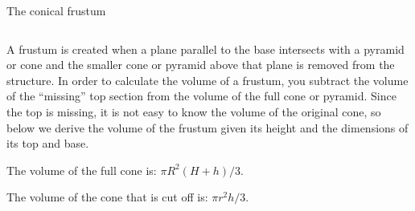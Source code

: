 \documentclass[9pt,aspectratio=169]{beamer}
\begin{document}
\begin{frame}{The conical frustum}
  \begin{columns}[T]
    \begin{column}{0.5\textwidth}
      \small
      A frustum is created when a plane parallel to the base intersects with a pyramid or cone and the smaller cone or pyramid above that plane is removed from the structure.  In order to calculate the volume of a frustum, you subtract the volume of the “missing” top section from the volume of the full cone or pyramid.  Since the top is missing, it is not easy to know the volume of the original cone, so below we derive the volume of the frustum given its height and the dimensions of its top and base.

      The volume of the full cone is: $\pi R^2 (H + h)/3$.

      The volume of the cone that is cut off is:  $\pi r^2 h/3$.


\end{column}
\end{columns}
\end{frame}
\end{document}
